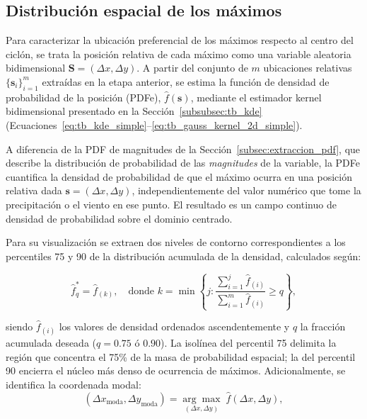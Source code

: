 \subsection{Distribución espacial de los máximos}\label{subsec:kde_localizacion}

Para caracterizar la ubicación preferencial de los máximos respecto al centro del ciclón, se trata la posición relativa de cada máximo como una variable aleatoria bidimensional $\mathbf{S} = (\Delta x, \Delta y)$. A partir del conjunto de $m$ ubicaciones relativas $\{\mathbf{s}_i\}_{i=1}^{m}$ extraídas en la etapa anterior, se estima la función de densidad de probabilidad de la posición (PDFe), $\hat{f}(\mathbf{s})$, mediante el estimador kernel bidimensional presentado en la Sección~\ref{subsubsec:tb_kde} (Ecuaciones~\ref{eq:tb_kde_simple}--\ref{eq:tb_gauss_kernel_2d_simple}).

A diferencia de la PDF de magnitudes de la Sección~\ref{subsec:extraccion_pdf}, que describe la distribución de probabilidad de las \emph{magnitudes} de la variable, la PDFe cuantifica la densidad de probabilidad de que el máximo ocurra en una posición relativa dada $\mathbf{s} = (\Delta x, \Delta y)$, independientemente del valor numérico que tome la precipitación o el viento en ese punto. El resultado es un campo continuo de densidad de probabilidad sobre el dominio centrado.

Para su visualización se extraen dos niveles de contorno correspondientes a los percentiles 75 y 90 de la distribución acumulada de la densidad, calculados según:

\begin{equation}
    \hat{f}^*_q = \hat{f}_{(k)}, \quad \text{donde } k = \min\!\left\{j : \frac{\sum_{i=1}^{j}\hat{f}_{(i)}}{\sum_{i=1}^{m}\hat{f}_{(i)}} \geq q \right\},
\label{eq:nivel_contorno_kde}
\end{equation}

siendo $\hat{f}_{(i)}$ los valores de densidad ordenados ascendentemente y $q$ la fracción acumulada deseada ($q = 0.75$ ó $0.90$). La isolínea del percentil 75 delimita la región que concentra el 75\% de la masa de probabilidad espacial; la del percentil 90 encierra el núcleo más denso de ocurrencia de máximos. Adicionalmente, se identifica la coordenada modal:
\begin{equation}
    (\Delta x_{\text{moda}}, \Delta y_{\text{moda}}) = \underset{(\Delta x, \Delta y)}{\arg\max}\; \hat{f}(\Delta x, \Delta y),
\label{eq:moda_kde}
\end{equation}

